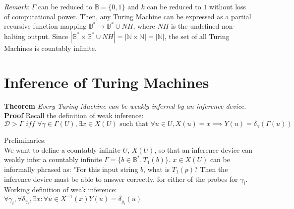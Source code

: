 \documentclass[11pt]{article}
\newcommand{\N}{\mathbb{N}}
\newcommand{\B}{\mathbb{B}}
\begin{document}
\bigbreak

\textit{Remark}: $\Gamma$ can be reduced to $ \B = \{0, 1\} $ and $ k $ can be reduced to $ 1 $ without loss of computational power. Then, any Turing Machine can be expressed as a partial recursive function mapping $ \B^{*} \rightarrow \B^{*} \cup NH $, where $ NH $ is the undefined non-halting output. Since $ |\B^{*} \times \B^{*} \cup NH | = | \N \times \N | = | \N | $, the set of all Turing Machines is countably infinite. 





\pagebreak


\section{Inference of Turing Machines} 

\textbf{Theorem} \quad \textit{Every Turing Machine can be weakly inferred by an inference device.}\\
\textbf{Proof} \quad Recall the definition of weak inference: $$ \mathcal{D} > \Gamma \textit{ iff } \forall \gamma \in \Gamma(U), \exists x \in X(U) \text{ such that } \forall u \in U, X(u) = x \implies Y(u) = \delta_{\gamma}(\Gamma(u)) $$ 

Preliminaries: \\

We want to define a countably infinite $ U $, $ X(U) $, so that an inference device can weakly infer a countably infinite $ \Gamma = \{b \in \B^{*}, T_{1}(b) \} $. 
$x \in X(U) $ can be informally phrased as: "For this input string $ b $, what is $ T_{1}(p) $? Then the inference device must be able to answer correctly, for either of the probes for $ \gamma_{i} $. \\

Working definition of weak inference: $\forall \gamma_{i}, \forall \delta_{\gamma_{i}}, \exists x : \forall u \in  X^{-1}(x) Y(u) = \delta_{y_{i}}(u) $ \\
\end{document}
